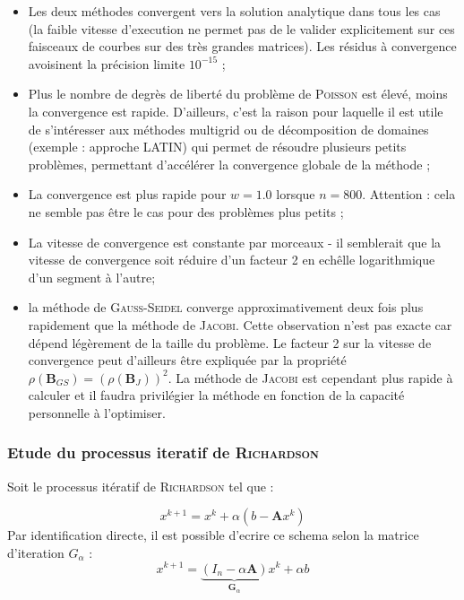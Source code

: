 \documentclass[12pt]{report}
\newcommand{\A}{\mathbf{A}}
\newcommand{\G}{\mathbf{G}}
\newcommand{\B}{\mathbf{B}}
\begin{document}
\begin{itemize}
\item Les deux méthodes convergent vers la solution analytique dans tous les cas (la faible vitesse d'execution ne permet pas de le valider explicitement sur ces faisceaux de courbes sur des très grandes matrices). Les résidus à convergence avoisinent la précision limite $10^{-15}$ ; 
\item Plus le nombre de degrès de liberté du problème de \textsc{Poisson} est élevé, moins la convergence est rapide. D'ailleurs, c'est la raison pour laquelle il est utile de s'intéresser aux méthodes multigrid ou de décomposition de domaines (exemple : approche \textsc{LATIN}) qui permet de résoudre plusieurs petits problèmes, permettant d'accélérer la convergence globale de la méthode ;
\item La convergence est plus rapide pour $w=1.0$ lorsque $n = 800$. Attention : cela ne semble pas être le cas pour des problèmes plus petits ;
\item La vitesse de convergence est constante par morceaux - il semblerait que la vitesse de convergence soit réduire d'un facteur 2 en echêlle logarithmique d'un segment à l'autre; 
\item la méthode de \textsc{Gauss-Seidel} converge approximativement deux fois plus rapidement que la méthode de \textsc{Jacobi}. Cette observation n'est pas exacte car dépend légèrement de la taille du problème. Le facteur 2 sur la vitesse de convergence peut d'ailleurs être expliquée par la propriété $\rho\left( \B_{GS}\right) = \left(\rho\left( \B_{J}\right)\right)^2$. La méthode de \textsc{Jacobi} est cependant plus rapide à calculer et il faudra privilégier la méthode en fonction de la capacité personnelle à l'optimiser.
\end{itemize}
\subsubsection{Etude du processus iteratif de \textsc{Richardson}}

Soit le processus itératif de \textsc{Richardson} tel que : 

\begin{equation}
x^{k+1} = x^{k} +   \alpha \left( b - \A x^k\right)
\end{equation}
Par identification directe, il est possible d'ecrire ce schema selon la matrice d'iteration $G_{\alpha}$ : 
\begin{equation}
x^{k+1} = \underbrace{\left( I_n - \alpha \A \right)}_{\G_{\alpha}}x^k + \alpha b
\end{equation}
\end{document}
